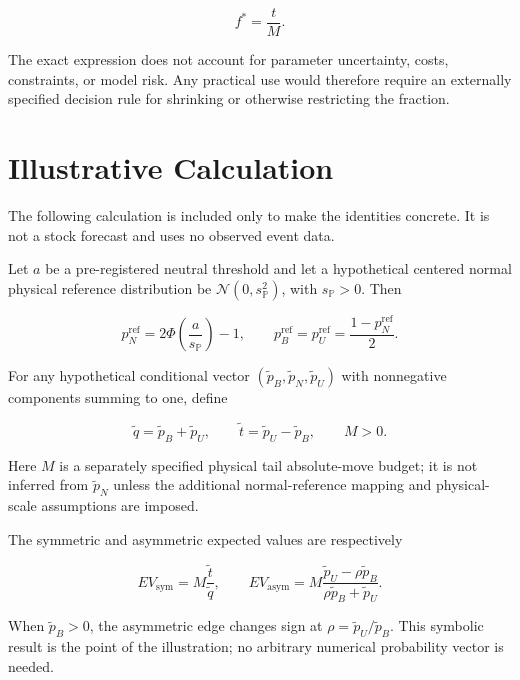 \[
f^*=\frac{t}{M}.
\]

The exact expression does not account for parameter uncertainty, costs,
constraints, or model risk. Any practical use would therefore require an
externally specified decision rule for shrinking or otherwise restricting the
fraction.

\section{Illustrative Calculation}
\label{app:illustration}

The following calculation is included only to make the identities concrete. It
is not a stock forecast and uses no observed event data.

Let $a$ be a pre-registered neutral threshold and let a hypothetical centered
normal physical reference distribution be $\mathcal N(0,s_{\mathbb P}^2)$, with
$s_{\mathbb P}>0$. Then

\[
p_N^{\mathrm{ref}}=2\Phi\left(\frac{a}{s_{\mathbb P}}\right)-1,
\qquad
p_B^{\mathrm{ref}}=p_U^{\mathrm{ref}}
=\frac{1-p_N^{\mathrm{ref}}}{2}.
\]

For any hypothetical conditional vector
$(\tilde p_B,\tilde p_N,\tilde p_U)$ with nonnegative components summing to
one, define

\[
\tilde q=\tilde p_B+\tilde p_U,
\qquad
\tilde t=\tilde p_U-\tilde p_B,
\qquad
M>0.
\]

Here $M$ is a separately specified physical tail absolute-move budget; it is
not inferred from $\tilde p_N$ unless the additional normal-reference mapping
and physical-scale assumptions are imposed.

The symmetric and asymmetric expected values are respectively

\[
EV_{\mathrm{sym}}=M\frac{\tilde t}{\tilde q},
\qquad
EV_{\mathrm{asym}}=M\frac{\tilde p_U-\rho\tilde p_B}
{\rho\tilde p_B+\tilde p_U}.
\]

When $\tilde p_B>0$, the asymmetric edge changes sign at
$\rho=\tilde p_U/\tilde p_B$. This symbolic result is the point of the
illustration; no arbitrary numerical probability vector is needed.

